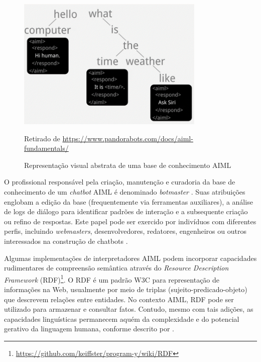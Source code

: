 \documentclass[14pt,a4paper,oneside]{book}
\begin{document}
\begin{figure}
    \centering
    \caption{Representação visual abstrata de uma base de conhecimento AIML}
    \includegraphics[width=0.8\textwidth]{./fig/image12} %
    \label{fig:representacaovisualabstrata}
    \vspace{0.2cm} %
    {\footnotesize 
	
	Retirado de \url{https://www.pandorabots.com/docs/aiml-fundamentals/}}
\end{figure}

O profissional responsável pela criação, manutenção e curadoria da base de conhecimento de um \emph{chatbot} AIML é denominado \emph{botmaster} \cite{Wallace2000}. Suas atribuições englobam a edição da base (frequentemente via ferramentas auxiliares), a análise de logs de diálogo para identificar padrões de interação e a subsequente criação ou refino de respostas. Este papel pode ser exercido por indivíduos com diferentes perfis, incluindo \emph{webmasters}, desenvolvedores, redatores, engenheiros ou outros interessados na construção de chatbots \cite{Wallace2000}.

Algumas implementações de interpretadores AIML podem incorporar capacidades rudimentares de compreensão semântica através do \emph{Resource Description Framework} (RDF)\footnote{\url{https://github.com/keiffster/program-y/wiki/RDF}}. O RDF é um padrão W3C para representação de informações na Web, usualmente por meio de triplas (sujeito-predicado-objeto) que descrevem relações entre entidades. No contexto AIML, RDF pode ser utilizado para armazenar e consultar fatos. Contudo, mesmo com tais adições, as capacidades linguísticas permanecem aquém da complexidade e do potencial gerativo da linguagem humana, conforme descrito por \cite{chomsky2002syntactic}.
\end{document}
